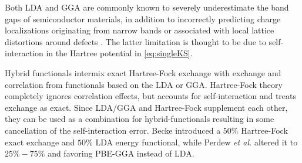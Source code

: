 Both LDA and GGA are commonly known to severely underestimate the band gaps of semiconductor materials, in addition to incorrectly predicting charge localizations originating from narrow bands or associated with local lattice distortions around defects \cite{Freysoldt2014}. The latter limitation is thought to be due to self-interaction in the Hartree potential in \autoref{eq:singleKS}.

Hybrid functionals intermix exact Hartree-Fock exchange with exchange and correlation from functionals based on the LDA or GGA. Hartree-Fock theory completely ignores correlation effects, but accounts for self-interaction and treats exchange as exact. Since LDA/GGA and Hartree-Fock supplement each other, they can be used as a combination for hybrid-functionals resulting in some cancellation of the self-interaction error. Becke \cite{Becke1993} introduced a $50\%$ Hartree-Fock exact exchange and
$50\%$ LDA energy functional, while Perdew \textit{et al.} \cite{Perdew1996a} altered it to $25\%-75\%$ and favoring PBE-GGA instead of LDA.

